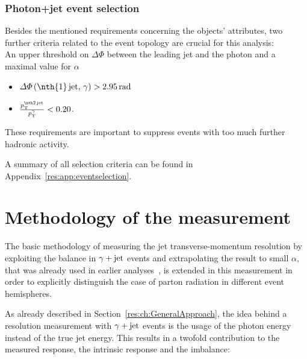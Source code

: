 \subsection{Photon+jet event selection}
Besides the mentioned requirements concerning the objects' attributes, two further criteria related to the event topology are crucial for this analysis:\\
An upper threshold on $\Delta \Phi$ between the leading jet and the photon and a maximal value for $\alpha$
\begin{itemize}
 \item $\Delta \Phi \left(\text{\nth{1}\,jet},\,\gamma \right) > 2.95\,\unit{rad}$
 \item $\frac{\ptsecondjet}{\ptgamma} < 0.20$.
\end{itemize}
These requirements are important to suppress events with too much further hadronic activity.

A summary of all selection criteria can be found in Appendix~\ref{res:app:eventselection}.

\FloatBarrier
\chapter{Methodology of the measurement}

The basic methodology of measuring the jet transverse-momentum resolution by exploiting the \pt balance in $\gamma + \text{jet}$ events and extrapolating the result to small $\alpha$, that was already used in earlier analyses~\cite{bib:CMS:JERCPaper_2011,CMS:PAS:JETResolution_7TeV}, 
is extended in this measurement in order to explicitly distinguish the case of parton radiation in different event hemispheres.

As already described in Section~\ref{res:ch:GeneralApproach}, the idea behind a resolution measurement with $\gamma + \text{jet}$ events is the usage of the photon energy instead of the true jet energy.
This results in a twofold contribution to the measured response, the intrinsic response and the imbalance:

